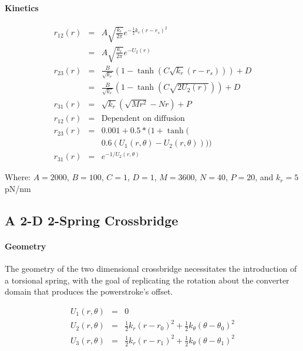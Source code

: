 \documentclass[]{article}
\begin{document}
 
\paragraph*{Kinetics}

\begin{eqnarray}  
\label{1sTransRates}
	r_{12}(r)   & = & A \sqrt{\frac{k_r}{2 \pi}} e^{-\frac{1}{2} k_r (r-r_s)^2} \nonumber \\
	            & = & A \sqrt{\frac{k_r}{2 \pi}} e^{-U_2(r)} \nonumber \\
    r_{23}(r)   & = & \frac{B}{\sqrt{k_r}} (1 - \tanh(C \sqrt{k_r} (r-r_s))) + D \\
                & = & \frac{B}{\sqrt{k_r}} (1 - \tanh(C \sqrt{2 U_2(r)})) + D \\
	r_{31}(r)   & = & \sqrt{k_r} (\sqrt{M r^2} - N r) + P \\
	r_{12}(r)   & = & \textrm{Dependent on diffusion} \nonumber \\
    r_{23}(r)   & = & 0.001 + 0.5 * (1 + \tanh( \nonumber \\
                        &   & 0.6 (U_1(r, \theta) - U_2(r, \theta)))) \\
	r_{31}(r)   & = & e^{-1 / U_2(r, \theta)}
\end{eqnarray} 
 
Where: $A = 2000$, $B = 100$, $C = 1$, $D = 1$, $M = 3600$, $N = 40$, $P = 20$, and $k_r = 5$ pN/nm



\subsection*{A 2-D 2-Spring Crossbridge}


\paragraph*{Geometry}

The geometry of the two dimensional crossbridge necessitates the introduction of a torsional spring, with the goal of replicating the rotation about the converter domain that produces the powerstroke's offset.


\begin{eqnarray}
\label{2sEnergy}
	U_1(r,\theta) & = & 0 \nonumber \\
    U_2(r,\theta) & = & \frac{1}{2}k_r (r - r_0)^2 + 
                        \frac{1}{2}k_\theta (\theta - \theta_0)^2 \nonumber \\
    U_3(r,\theta) & = & \frac{1}{2}k_r (r - r_1)^2 + 
                        \frac{1}{2}k_\theta (\theta - \theta_1)^2 \\
\end{eqnarray}
\end{document}
